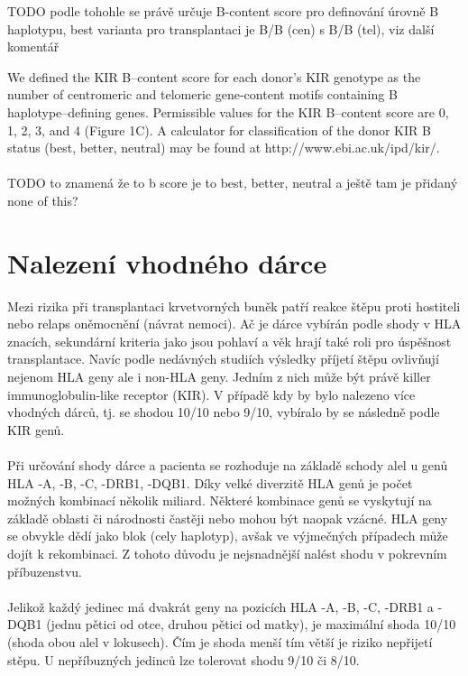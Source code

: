 \documentclass[czech,DP]{thesiskiv}
\numberwithin{equation}{section}
\begin{document}
TODO podle tohohle se právě určuje B-content score pro definování úrovně B haplotypu, best varianta pro transplantaci je B/B (cen) s B/B (tel), viz další komentář


We defined the KIR B–content score for each donor's KIR genotype as the number of centromeric and telomeric gene-content motifs containing B haplotype–defining genes. Permissible values for the KIR B–content score are 0, 1, 2, 3, and 4 (Figure 1C). A calculator for classification of the donor KIR B status (best, better, neutral) may be found at http://www.ebi.ac.uk/ipd/kir/.
\\
\\
TODO to znamená že to b score je to best, better, neutral a ještě tam je přidaný none of this? 


\section{Nalezení vhodného dárce}
Mezi rizika při transplantaci krvetvorných buněk patří reakce štěpu proti hostiteli nebo relaps oněmocnění (návrat nemoci). Ač je dárce vybírán podle shody v HLA znacích, sekundární kriteria jako jsou pohlaví a věk hrají také roli pro úspěšnost transplantace. Navíc podle nedávných studiích výsledky příjetí štěpu ovlivňují nejenom HLA geny ale i non-HLA geny. Jedním z nich může být právě killer immunoglobulin-like receptor (KIR). V případě kdy by bylo nalezeno více vhodných dárců, tj. se shodou 10/10 nebo 9/10, vybíralo by se následně podle KIR genů. \cite{KIR_transplantace_jindra} \cite{Frycova_bakalarka}
\\
\\
Při určování shody dárce a pacienta se rozhoduje na základě schody alel u genů HLA -A, -B, -C, -DRB1, -DQB1. Díky velké diverzitě HLA genů je počet možných kombinací několik miliard. Některé kombinace genů se vyskytují na základě oblasti či národnosti častěji nebo mohou být naopak vzácné. HLA geny se obvykle dědí jako blok (cely haplotyp), avšak ve výjmečných případech může dojít k rekombinaci. Z tohoto důvodu je nejsnadnější nalést shodu v pokrevním příbuzenstvu.
\\
\\
Jelikož každý jedinec má dvakrát geny na pozicích HLA -A, -B, -C, -DRB1 a -DQB1 (jednu pětici od otce, druhou pětici od matky), je maximální shoda 10/10 (shoda obou alel v lokusech). Čím je shoda menší tím větší je riziko nepřijetí stěpu. U nepříbuzných jedinců lze tolerovat shodu 9/10 či 8/10. \cite{Frycova_bakalarka} \cite{KIR_transplantace_jindra}
\end{document}
